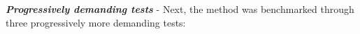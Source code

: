 %
%
%
%
%

\textbf{\textit{Progressively demanding tests}} - Next, the method was benchmarked through three progressively more demanding tests:

